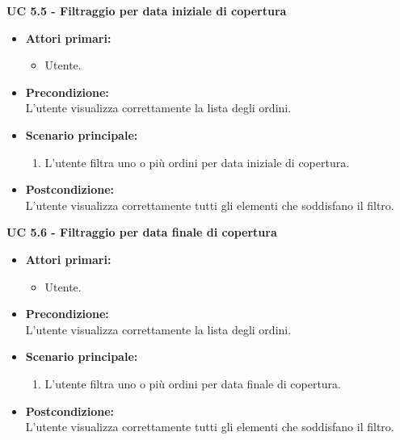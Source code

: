 \vspace{0.5cm}

\noindent \textbf{\large UC 5.5 - Filtraggio per data iniziale di copertura}
\label{uc:filtraggio-data-iniziale-copertura}
\begin{itemize}

	\item \textbf{Attori primari: }
		\begin{itemize}
			\item Utente.
		\end{itemize}

	\item \textbf{Precondizione: }\\[0.3cm]
		L'utente visualizza correttamente la lista degli ordini.

	\item \textbf{Scenario principale: }
		\begin{enumerate}
			\item L'utente filtra uno o più ordini per data iniziale di copertura.
		\end{enumerate}
		

	\item \textbf{Postcondizione: }\\[0.3cm]
		L'utente visualizza correttamente tutti gli elementi che soddisfano il filtro.

\end{itemize}

\vspace{0.5cm}

\noindent \textbf{\large UC 5.6 - Filtraggio per data finale di copertura}
\label{uc:filtraggio-data-finale-copertura}
\begin{itemize}

	\item \textbf{Attori primari: }
		\begin{itemize}
			\item Utente.
		\end{itemize}

	\item \textbf{Precondizione: }\\[0.3cm]
		L'utente visualizza correttamente la lista degli ordini.

	\item \textbf{Scenario principale: }
		\begin{enumerate}
			\item L'utente filtra uno o più ordini per data finale di copertura.
		\end{enumerate}
		

	\item \textbf{Postcondizione: }\\[0.3cm]
		L'utente visualizza correttamente tutti gli elementi che soddisfano il filtro.

\end{itemize}

